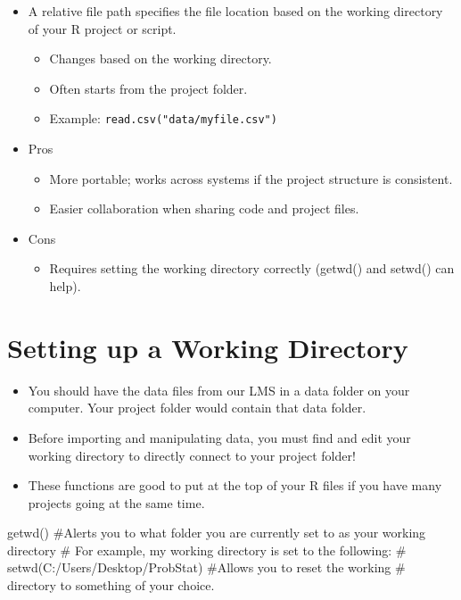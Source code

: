 \documentclass[
  letterpaper,
  DIV=11,
  numbers=noendperiod]{scrreprt}
\newenvironment{Shaded}{\begin{snugshade}}{\end{snugshade}}
\newcommand{\CommentTok}[1]{\textcolor[rgb]{0.37,0.37,0.37}{#1}}
\newcommand{\FunctionTok}[1]{\textcolor[rgb]{0.28,0.35,0.67}{#1}}
\newcommand{\NormalTok}[1]{\textcolor[rgb]{0.00,0.23,0.31}{#1}}
\providecommand{\tightlist}{%
  \setlength{\itemsep}{0pt}\setlength{\parskip}{0pt}}\usepackage{longtable,booktabs,array}
\begin{document}
\begin{itemize}
\tightlist
\item
  A relative file path specifies the file location based on the working
  directory of your R project or script.

  \begin{itemize}
  \tightlist
  \item
    Changes based on the working directory.
  \item
    Often starts from the project folder.
  \item
    Example: \texttt{read.csv("data/myfile.csv")}
  \end{itemize}
\item
  Pros

  \begin{itemize}
  \tightlist
  \item
    More portable; works across systems if the project structure is
    consistent.
  \item
    Easier collaboration when sharing code and project files.
  \end{itemize}
\item
  Cons

  \begin{itemize}
  \tightlist
  \item
    Requires setting the working directory correctly (getwd() and
    setwd() can help).
  \end{itemize}
\end{itemize}

\section{Setting up a Working
Directory}\label{setting-up-a-working-directory}

\begin{itemize}
\item
  You should have the data files from our LMS in a data folder on your
  computer. Your project folder would contain that data folder.
\item
  Before importing and manipulating data, you must find and edit your
  working directory to directly connect to your project folder!
\item
  These functions are good to put at the top of your R files if you have
  many projects going at the same time.
\end{itemize}

\begin{Shaded}
\begin{Highlighting}[]
\FunctionTok{getwd}\NormalTok{()  }\CommentTok{\#Alerts you to what folder you are currently set to as your working directory}
\CommentTok{\# For example, my working directory is set to the following:}
\CommentTok{\# setwd(\textquotesingle{}C:/Users/Desktop/ProbStat\textquotesingle{}) \#Allows you to reset the working}
\CommentTok{\# directory to something of your choice.}
\end{Highlighting}
\end{Shaded}
\end{document}
